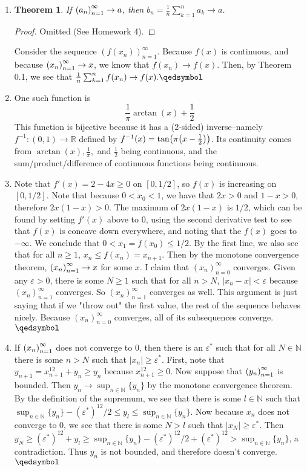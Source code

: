 \documentclass[12pt]{article}
\def\mbb#1{\mathbb{#1}}
\def\bN{\mbb{N}}
\def\bR{\mbb{R}}
\newtheorem{theorem}{Theorem}[section]
\theoremstyle{definition}
\theoremstyle{remark}
\newcommand{\ve}{\varepsilon}
\renewcommand{\qed}{\hfill\qedsymbol}
\newcommand{\seq}[2]{\qty(#1_#2)_{#2=1}^{\infty}}
\renewcommand{\geq}{\geqslant}
\renewcommand{\leq}{\leqslant}
\begin{document}
\begin{enumerate}[leftmargin=\labelsep]
		\item 
		\begin{theorem}
			If $\seq{a}{n} \to a$, then $b_n = \frac1n \sum_{k=1}^{n} a_k \to a$.
		\end{theorem}
		\begin{proof}
			Omitted (See Homework 4).
		\end{proof}
		Consider the sequence $(f(x_n))_{n=1}^{\infty}$. Because $f(x)$ is continuous, and because $\seq{x}{n} \to x$, we know that $f(x_n) \to f(x)$. Then, by Theorem 0.1, we see that $\frac1n \sum_{k=1}^{n} f(x_n) \to f(x). \qed$
		
		\item 
		One such function is 
		$$\frac1{\pi} \arctan(x)+\frac12$$
		This function is bijective because it has a (2-sided) inverse--namely $f^{-1}: (0,1) \to \bR$ defined by $f^{-1}(x)=\tan(\pi\qty(x-\frac12))$. Its continuity comes from $\arctan(x), \frac1{\pi},$ and $\frac12$ being continuous, and the sum/product/difference of continuous functions being continuous.
		
		\item 
		Note that $f'(x)=2-4x \geq 0$ on $[0, 1/2]$, so $f(x)$ is increasing on $[0, 1/2]$. Note that because $0<x_0<1$, we have that $2x > 0$ and $1-x > 0$, therefore $2x(1-x) > 0$. The maximum of $2x(1-x)$ is $1/2$, which can be found by setting $f'(x)$ above to 0, using the second derivative test to see that $f(x)$ is concave down everywhere, and noting that the $f(x)$ goes to $-\infty$. We conclude that $0 < x_1=f(x_0) \leq 1/2$. By the first line, we also see that for all $n \geq 1$, $x_n \leq f(x_n)=x_{n+1}$. Then by the monotone convergence theorem, $\seq{x}{n} \to x$ for some $x$. I claim that $(x_n)_{n=0}^{\infty}$ converges. Given any $\ve > 0$, there is some $N \geq 1$ such that for all $n > N$, $|x_n-x| < \ve$ because $(x_n)_{n=1}^{\infty}$ converges. So $(x_n)_{n=1}^{\infty}$ converges as well. This argument is just saying that if we "throw out" the first value, the rest of the sequence behaves nicely. Because $(x_n)_{n=0}^{\infty}$ converges, all of its subsequences converge. $\qed$
		
		\item
		If $\seq{x}{n}$ does not converge to 0, then there is an $\ve^*$ such that for all $N \in \bN$ there is some $n > N$ such that $|x_n| \geq \ve^*$. First, note that $y_{n+1} = x_{n+1}^{12} + y_n \geq y_n$ because $x_{n+1}^{12} \geq 0$. Now suppose that $\seq{y}{n}$ is bounded. Then $y_n \to \sup_{n \in \bN}\{y_n\}$ by the monotone convergence theorem. By the definition of the supremum, we see that there is some $l \in \bN$ such that $\sup_{n \in \bN}\{y_n\} - (\ve^*)^{12}/2 \leq y_l \leq \sup_{n \in \bN}\{y_n\}$. Now because $x_n$ does not converge to 0, we see that there is some $N > l$ such that $|x_N| \geq \ve^*$. Then $y_N \geq (\ve^*)^{12} + y_l \geq \sup_{n \in \bN}\{y_n\} - (\ve^*)^{12}/2 + (\ve^*)^{12} > \sup_{n \in \bN}\{y_n\}$, a contradiction. Thus $y_n$ is not bounded, and therefore doesn't converge. $\qed$
		

\end{enumerate}
\end{document}
